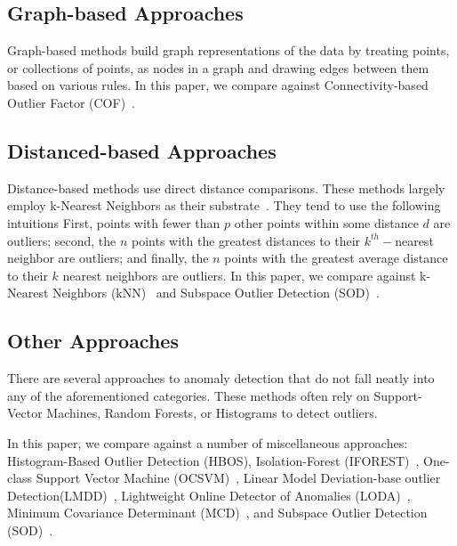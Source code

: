 \subsection{Graph-based Approaches}
\label{subsec:introduction:graph-based-approaches}

Graph-based methods build graph representations of the data by treating points, or collections of points, as nodes in a graph and drawing edges between them based on various rules.
In this paper, we compare against Connectivity-based Outlier Factor (COF)~\cite{tang2002cof}.


\subsection{Distanced-based Approaches}
\label{subsec:related-works:distanced-based-approaches}

Distance-based methods use direct distance comparisons.
These methods largely employ k-Nearest Neighbors as their substrate~\cite{wang2019progress}.
They tend to use the following intuitions
First, points with fewer than $p$ other points within some distance $d$ are outliers;
second, the $n$ points with the greatest distances to their $k^{th}-$nearest neighbor are outliers;
and finally, the $n$ points with the greatest average distance to their $k$ nearest neighbors are outliers.
In this paper, we compare against
k-Nearest Neighbors (kNN)~\cite{ramaswamy2000efficient, sridhar2000knn, fabrizio2002knn}
and Subspace Outlier Detection (SOD)~\cite{kriegel2009sod}.


\subsection{Other Approaches}
\label{subsec:introduction:other-appraoches}

There are several approaches to anomaly detection that do not fall neatly into any of the aforementioned categories.
These methods often rely on Support-Vector Machines, Random Forests, or Histograms to detect outliers.

In this paper, we compare against a number of miscellaneous approaches:
Histogram-Based Outlier Detection (HBOS)\cite{goldstein2012histogram},
Isolation-Forest (IFOREST)~\cite{tony2008iforest,tony2012iforest},
One-class Support Vector Machine (OCSVM)~\cite{sholkopf2001ocsvm},
Linear Model Deviation-base outlier Detection(LMDD)~\cite{arning1996linear},
Lightweight Online Detector of Anomalies (LODA)~\cite{pevny2016loda},
Minimum Covariance Determinant (MCD)~\cite{rousseeuw1999mcd,hardin2004mcd}, and
Subspace Outlier Detection (SOD)~\cite{kriegel2009sod}.


